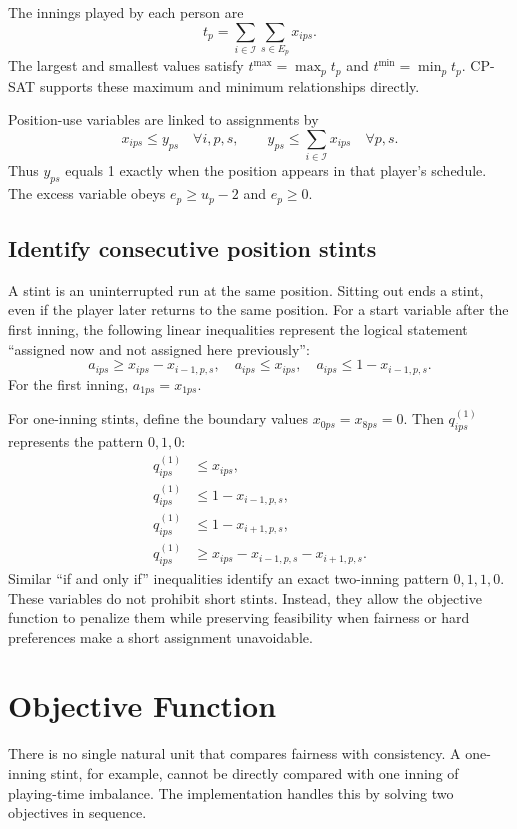 \documentclass[11pt]{article}
\begin{document}
The innings played by each person are
\[
t_p=\sum_{i\in\mathcal{I}}\sum_{s\in E_p}x_{ips}.
\]
The largest and smallest values satisfy
$t^{\max}=\max_p t_p$ and $t^{\min}=\min_p t_p$. CP-SAT supports these
maximum and minimum relationships directly.

Position-use variables are linked to assignments by
\[
x_{ips}\leq y_{ps}\quad\forall i,p,s,
\qquad
y_{ps}\leq\sum_{i\in\mathcal{I}}x_{ips}\quad\forall p,s.
\]
Thus $y_{ps}$ equals 1 exactly when the position appears in that player's
schedule. The excess variable obeys $e_p\geq u_p-2$ and $e_p\geq0$.

\subsection{Identify consecutive position stints}

A stint is an uninterrupted run at the same position. Sitting out ends a
stint, even if the player later returns to the same position. For a start
variable after the first inning, the following linear inequalities represent
the logical statement ``assigned now and not assigned here previously'':
\[
a_{ips}\geq x_{ips}-x_{i-1,p,s},\quad
a_{ips}\leq x_{ips},\quad
a_{ips}\leq1-x_{i-1,p,s}.
\]
For the first inning, $a_{1ps}=x_{1ps}$.

For one-inning stints, define the boundary values $x_{0ps}=x_{8ps}=0$. Then
$q^{(1)}_{ips}$ represents the pattern $0,1,0$:
\[
\begin{aligned}
q^{(1)}_{ips}&\leq x_{ips},\\
q^{(1)}_{ips}&\leq1-x_{i-1,p,s},\\
q^{(1)}_{ips}&\leq1-x_{i+1,p,s},\\
q^{(1)}_{ips}&\geq x_{ips}-x_{i-1,p,s}-x_{i+1,p,s}.
\end{aligned}
\]
Similar ``if and only if'' inequalities identify an exact two-inning pattern
$0,1,1,0$. These variables do not prohibit short stints. Instead, they allow
the objective function to penalize them while preserving feasibility when
fairness or hard preferences make a short assignment unavoidable.

\section{Objective Function}

There is no single natural unit that compares fairness with consistency. A
one-inning stint, for example, cannot be directly compared with one inning of
playing-time imbalance. The implementation handles this by solving two
objectives in sequence.
\end{document}
